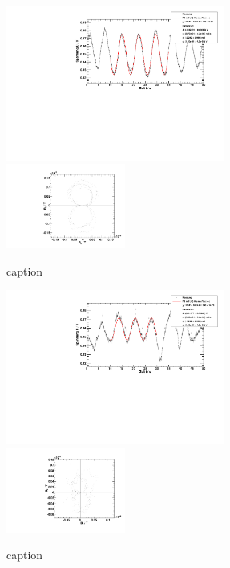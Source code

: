 \begin{figure}[H]
\begin{center}
  \includegraphics[width=0.64\textwidth]{../img/fit_Spule_R4.pdf}
  \includegraphics[width=0.35\textwidth]{../img/polar_Spule_R4.pdf}
  \caption{caption}
  \label{img:R4}
\end{center}
\end{figure}

\begin{figure}[H]
\begin{center}
  \includegraphics[width=0.64\textwidth]{../img/fit_Spule_R5_1.pdf}
  \includegraphics[width=0.35\textwidth]{../img/polar_Spule_R5_1.pdf}
  \caption{caption}
  \label{img:R5}
\end{center}
\end{figure}

